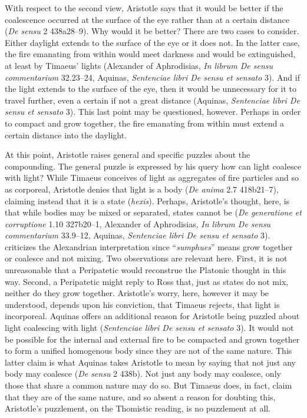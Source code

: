 With respect to the second view, Aristotle says that it would be better if the coalescence occurred at the surface of the eye rather than at a certain distance (\emph{De sensu} 2 438a28--9). Why would it be better? There are two cases to consider. Either daylight extends to the surface of the eye or it does not. In the latter case, the fire emanating from within would meet darkness and would be extinguished, at least by Timaeus' lights (Alexander of Aphrodisias, \emph{In librum De sensu commentarium} 32.23--24, Aquinas, \emph{Sentenciae libri De sensu et sensato} 3). And if the light extends to the surface of the eye, then it would be unnecessary for it to travel further, even a certain if not a great distance (Aquinas, \emph{Sentenciae libri De sensu et sensato} 3). This last point may be questioned, however. Perhaps in order to compact and grow together, the fire emanating from within must extend a certain distance into the daylight.

At this point, Aristotle raises general and specific puzzles about the compounding. The general puzzle is expressed by his query how can light coalesce with light? While Timaeus conceives of light as aggregates of fire particles and so as corporeal, Aristotle denies that light is a body (\emph{De anima} 2.7 418b21--7), claiming instead that it is a state (\emph{hexis}). Perhaps, Aristotle's thought, here, is that while bodies may be mixed or separated, states cannot be (\emph{De generatione et corruptione} 1.10 327b20--1, Alexander of Aphrodisias, \emph{In librum De sensu commentarium} 33.9--12, Aquinas, \emph{Sentenciae libri De sensu et sensato} 3). \citet[140--1]{Ross:1906xi} criticizes the Alexandrian interpretation since ``\emph{sumphues}'' means grow together or coalesce and not mixing. Two observations are relevant here. First, it is not unreasonable that a Peripatetic would reconstrue the Platonic thought in this way. Second, a Peripatetic might reply to Ross that, just as states do not mix, neither do they grow together. Aristotle's worry, here, however it may be understood, depends upon his conviction, that Timaeus rejects, that light is incorporeal. Aquinas offers an additional reason for Aristotle being puzzled about light coalescing with light (\emph{Sentenciae libri De sensu et sensato} 3). It would not be possible for the internal and external fire to be compacted and grown together to form a unified homogenous body since they are not of the same nature. This latter claim is what Aquinas takes Aristotle to mean by saying that not just any body may coalesce (\emph{De sensu} 2 438b). Not just any body may coalesce, only those that share a common nature may do so. But Timaeus does, in fact, claim that they are of the same nature, and so absent a reason for doubting this, Aristotle's puzzlement, on the Thomistic reading, is no puzzlement at all. 


